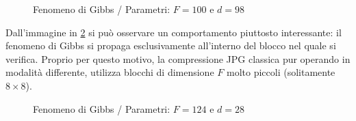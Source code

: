 \documentclass[11pt,italian]{article}
\begin{document}
\begin{figure}[H]
    \caption{Fenomeno di Gibbs / Parametri: $F=100$ e $d=98$}
    \label{fig:c-scale-gibbs}
\end{figure}

\noindent
Dall'immagine in \cref{fig:deer-gibbs} si può osservare un comportamento piuttosto interessante: il fenomeno di Gibbs si propaga esclusivamente all'interno del blocco nel quale si verifica.
Proprio per questo motivo, la compressione JPG classica pur operando in modalità differente, utilizza blocchi di dimensione $F$ molto piccoli (solitamente $8\times 8$).

\begin{figure}[H]
    \caption{Fenomeno di Gibbs / Parametri: $F=124$ e $d=28$}
    \label{fig:deer-gibbs}
\end{figure}
\end{document}
